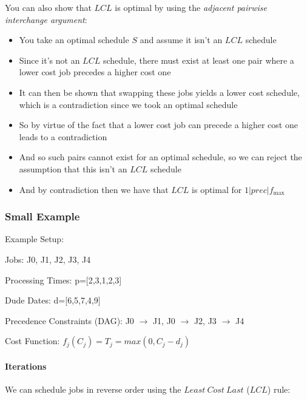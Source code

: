 \documentclass[fleqn]{article}
\begin{document}
  You can also show that $LCL$ is optimal by using the \textit{adjacent pairwise interchange argument}:
  \begin{itemize}
    \item You take an optimal schedule $S$ and assume it isn't an $LCL$ schedule
    \item Since it's not an $LCL$ schedule, there must exist at least one pair where a lower cost job precedes a higher cost one
    \item It can then be shown that swapping these jobs yields a lower cost schedule, which is a contradiction since we took an optimal schedule
    \item So by virtue of the fact that a lower cost job can precede a higher cost one leads to a contradiction
    \item And so such pairs cannot exist for an optimal schedule, so we can reject the assumption that this isn't an $LCL$ schedule
    \item And by contradiction then we have that $LCL$ is optimal for $1|prec|f_{\text{max}}$
  \end{itemize}
  
  \subsubsection*{Small Example}
  Example Setup:

    Jobs: J0, J1, J2, J3, J4

    Processing Times: p=[2,3,1,2,3]

    Dude Dates: d=[6,5,7,4,9]

    Precedence Constraints (DAG): J0 $\to$ J1, J0 $\to$ J2, J3 $\to$ J4

    Cost Function: $f_j(C_j) = T_j = max(0, C_j - d_j)$
    
    \paragraph{Iterations}
    We can schedule jobs in reverse order using the $Least\ Cost\ Last$ ($LCL$) rule:
    
\end{document}
